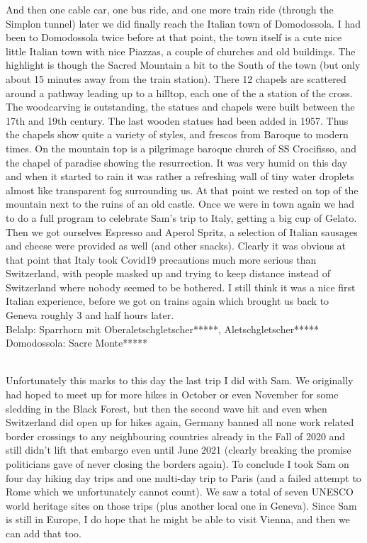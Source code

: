 And then one cable car, one bus ride, and one more train ride (through the Simplon tunnel) later we did finally reach the Italian town of Domodossola. I had been to Domodossola twice before at that point, the town itself is a cute nice little Italian town with nice Piazzas, a couple of churches and old buildings. The highlight is though the Sacred Mountain a bit to the South of the town (but only about 15 minutes away from the train station). There 12 chapels are scattered around a pathway leading up to a hilltop, each one of the a station of the cross. The woodcarving is outstanding, the statues and chapels were built between the 17th and 19th century. The last wooden statues had been added in 1957. Thus the chapels show quite a variety of styles, and frescos from Baroque to modern times. On the mountain top is a pilgrimage baroque church of SS Crocifisso, and the chapel of paradise showing the resurrection. It was very humid on this day and when it started to rain it was rather a refreshing wall of tiny water droplets almost like transparent fog surrounding us. At that point we rested on top of the mountain next to the ruins of an old castle. Once we were in town again we had to do a full program to celebrate Sam's trip to Italy, getting a big cup of Gelato. Then we got ourselves Espresso and Aperol Spritz, a selection of Italian sausages and cheese were provided as well (and other snacks). Clearly it was obvious at that point that Italy took Covid19 precautions much more serious than Switzerland, with people masked up and trying to keep distance instead of Switzerland where nobody seemed to be bothered. I still think it was a nice first Italian experience, before we got on trains again which brought us back to Geneva roughly 3 and half hours later.\\

Belalp: Sparrhorn mit Oberaletschgletscher*****, Aletschgletscher*****\\
Domodossola: Sacre Monte*****\\\

Unfortunately this marks to this day the last trip I did with Sam. We originally had hoped to meet up for more hikes in October or even November for some sledding in the Black Forest, but then the second wave hit and even when Switzerland did open up for hikes again, Germany banned all none work related border crossings to any neighbouring countries already in the Fall of 2020 and still didn't lift that embargo even until June 2021 (clearly breaking the promise politicians gave of never closing the borders again). To conclude I took Sam on four day hiking day trips and one multi-day trip to Paris (and a failed attempt to Rome which we unfortunately cannot count). We saw a total of seven UNESCO world heritage sites on those trips (plus another local one in Geneva). Since Sam is still in Europe, I do hope that he might be able to visit Vienna, and then we can add that too.

